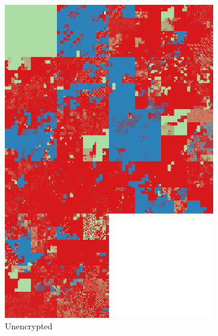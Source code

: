 \documentclass[
  digital, %
  color,   %
  oneside, %
  lof,     %
  nolot,     %
]{fithesis4}
\begin{document}
\begin{figure}
    \centering
    \begin{subfigure}[t]{.45\textwidth}
        \centering
        \includegraphics[width=\textwidth,interpolate=false]{ubnt-unencrypted-test-chi2-4-hilbert.png}
        \caption{Unencrypted}
        \label{fig:bad-enc-unenc}
    \end{subfigure}
    \hfill
    \begin{subfigure}[t]{.45\textwidth}
        \centering

\end{subfigure}
\end{figure}
\end{document}
